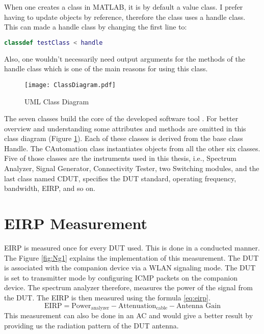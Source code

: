When one creates a class in MATLAB\textregistered{}, it is by default a value class. I prefer having to update objects by reference, therefore the class uses a handle class. This can made a handle class by changing the first line to:
\begin{lstlisting}[language=MATLAB]
classdef testClass < handle
\end{lstlisting}
Also, one wouldn't necessarily need output arguments for the methods of the handle class which is one of the main reasons for using this class. 

\begin{figure}[H]
\centering
\texttt{[image: ClassDiagram.pdf]}
\caption{UML Class Diagram}
\label{fig:cd} 
\end{figure}

The seven classes build the core of the developed software tool . For better overview and understanding some attributes and methods are omitted in this class diagram (Figure \ref{fig:cd}). Each of these classes is derived from the base class Handle. The CAutomation class instantiates objects from all the other six classes. Five of those classes are the instruments used in this thesis, i.e., Spectrum Analyzer, Signal Generator, Connectivity Tester, two Switching modules, and the last class named CDUT, specifies the \acs{DUT} standard, operating frequency, bandwidth, \acs{EIRP}, and so on.

\section{\acs{EIRP} Measurement}
\acs{EIRP} is measured once for every \acs{DUT} used. This is done in a conducted manner. The Figure \ref{fig:Ng1} explains the implementation of this measurement. The \acs{DUT} is associated with the companion device via a \acs{WLAN} signaling mode. The \acs{DUT} is set to transmitter mode by configuring \acs{ICMP} packets on the companion device. The spectrum analyzer therefore, measures the power of the signal from the \acs{DUT}. The \acs{EIRP} is then measured using the formula \ref{eq:eirp}.
\begin{equation}
\mbox{EIRP}  = \mbox{Power}_{\mbox{analyzer}} - \mbox{Attenuation}_{\mbox{cable}} - \mbox{Antenna Gain} \label{eq:eirp}
\end{equation}
This measurement can also be done in an \acf{AC} and would give a better result by providing us the radiation pattern of the \acs{DUT} antenna.


